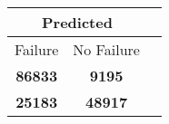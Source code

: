 \begin{tabular} 
 {@{}ccc@{}} 
\toprule 
\multicolumn{2}{c}{\textbf{Predicted}}
 \\ \midrule 
\multicolumn{1}{|c|}{Failure} & 
\multicolumn{1}{c|}{No Failure}
 \\ \midrule 
\multicolumn{1}{|c|}{\color{green}\textbf{86833}} & 
\multicolumn{1}{c|}{\color{red}\textbf{9195}}
 \\ \midrule 
\multicolumn{1}{|c|}{\color{red}\textbf{25183}} & 
\multicolumn{1}{c|}{\color{green}\textbf{48917}}
 \\ \bottomrule 
\end{tabular} 
